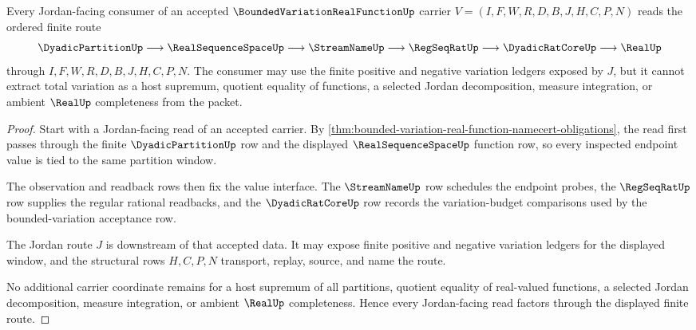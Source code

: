 \begin{theorem}
\label{thm:bounded-variation-real-function-jordan-route}
Every Jordan-facing consumer of an accepted $\BoundedVariationRealFunctionUp$ carrier $V=(I,F,W,R,D,B,J,H,C,P,N)$ reads the ordered finite route
$$
\DyadicPartitionUp
\longrightarrow
\RealSequenceSpaceUp
\longrightarrow
\StreamNameUp
\longrightarrow
\RegSeqRatUp
\longrightarrow
\DyadicRatCoreUp
\longrightarrow
\RealUp
$$
through $I,F,W,R,D,B,J,H,C,P,N$. The consumer may use the finite positive and negative variation ledgers exposed by $J$, but it cannot extract total variation as a host supremum, quotient equality of functions, a selected Jordan decomposition, measure integration, or ambient $\RealUp$ completeness from the packet.
\end{theorem}
\begin{proof}
Start with a Jordan-facing read of an accepted carrier. By \autoref{thm:bounded-variation-real-function-namecert-obligations}, the read first passes through the finite $\DyadicPartitionUp$ row and the displayed $\RealSequenceSpaceUp$ function row, so every inspected endpoint value is tied to the same partition window.

The observation and readback rows then fix the value interface. The $\StreamNameUp$ row schedules the endpoint probes, the $\RegSeqRatUp$ row supplies the regular rational readbacks, and the $\DyadicRatCoreUp$ row records the variation-budget comparisons used by the bounded-variation acceptance row.

The Jordan route $J$ is downstream of that accepted data. It may expose finite positive and negative variation ledgers for the displayed window, and the structural rows $H,C,P,N$ transport, replay, source, and name the route.

No additional carrier coordinate remains for a host supremum of all partitions, quotient equality of real-valued functions, a selected Jordan decomposition, measure integration, or ambient $\RealUp$ completeness. Hence every Jordan-facing read factors through the displayed finite route.
\end{proof}

